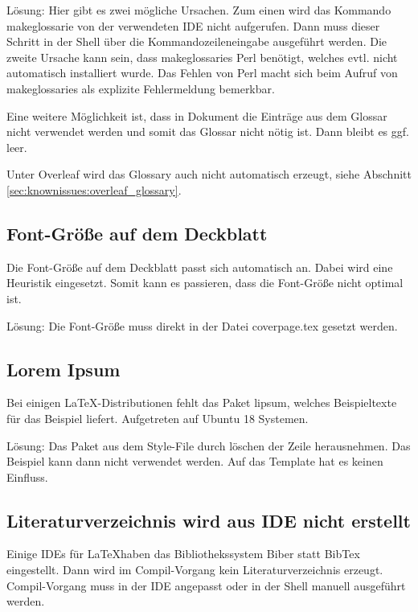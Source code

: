 Lösung: Hier gibt es zwei mögliche Ursachen. Zum einen wird das Kommando makeglossarie von der verwendeten IDE nicht aufgerufen. Dann muss dieser Schritt in der Shell über die Kommandozeileneingabe ausgeführt werden. Die zweite Ursache kann sein, dass makeglossaries Perl benötigt, welches evtl. nicht automatisch installiert wurde. Das Fehlen von Perl macht sich beim Aufruf von makeglossaries als explizite Fehlermeldung bemerkbar.

Eine weitere Möglichkeit ist, dass in Dokument die Einträge aus dem Glossar nicht verwendet werden und somit das Glossar nicht nötig ist. Dann bleibt es ggf. leer.

Unter Overleaf wird das Glossary auch nicht automatisch erzeugt, siehe Abschnitt \ref{sec:knownissues:overleaf_glossary}. 

\subsection{Font-Größe auf dem Deckblatt}
Die Font-Größe auf dem Deckblatt passt sich automatisch an. Dabei wird eine Heuristik eingesetzt. Somit kann es passieren, dass die Font-Größe nicht optimal ist.

Lösung: Die Font-Größe muss direkt in der Datei coverpage.tex gesetzt werden.

\subsection{Lorem Ipsum}
Bei einigen \LaTeX -Distributionen fehlt das Paket lipsum, welches Beispieltexte für das Beispiel liefert. Aufgetreten auf  Ubuntu 18 Systemen.

Lösung: Das Paket aus dem Style-File durch löschen der Zeile herausnehmen. Das Beispiel kann dann nicht verwendet werden. Auf das Template hat es keinen Einfluss.

\subsection{Literaturverzeichnis wird aus IDE nicht erstellt}
Einige IDEs für \LaTeX haben das Bibliothekssystem Biber statt BibTex eingestellt. Dann wird im Compil-Vorgang kein Literaturverzeichnis erzeugt. Compil-Vorgang muss in der IDE angepasst oder in der Shell manuell ausgeführt werden.


